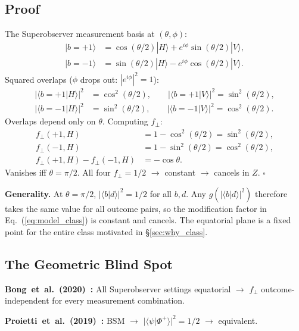\documentclass[twocolumn,aps,pra,superscriptaddress,floatfix,10pt]{revtex4-2}
\begin{document}
\subsection{Proof}

The Superobserver measurement basis at $(\theta,\phi)$:
\begin{align}
|b=+1\rangle &= \cos(\theta/2)|H\rangle
+ e^{i\phi}\sin(\theta/2)|V\rangle, \label{eq:basis_p} \\
|b=-1\rangle &= \sin(\theta/2)|H\rangle
- e^{i\phi}\cos(\theta/2)|V\rangle. \label{eq:basis_m}
\end{align}
Squared overlaps ($\phi$ drops out: $|e^{i\phi}|^2 = 1$):
\begin{align}
|\langle b=+1|H\rangle|^2 &= \cos^2(\theta/2), \qquad
|\langle b=+1|V\rangle|^2 = \sin^2(\theta/2), \label{eq:overlap_p} \\
|\langle b=-1|H\rangle|^2 &= \sin^2(\theta/2), \qquad
|\langle b=-1|V\rangle|^2 = \cos^2(\theta/2). \label{eq:overlap_m}
\end{align}
Overlaps depend only on $\theta$. Computing $f_\perp$:
\begin{align}
f_\perp(+1,H) &= 1 - \cos^2(\theta/2) = \sin^2(\theta/2), \label{eq:fp} \\
f_\perp(-1,H) &= 1 - \sin^2(\theta/2) = \cos^2(\theta/2), \label{eq:fm} \\
f_\perp(+1,H) - f_\perp(-1,H) &= -\cos\theta. \label{eq:diff}
\end{align}
Vanishes iff $\theta = \pi/2$. All four $f_\perp = 1/2$ $\to$ constant
$\to$ cancels in $Z$. \hfill $\square$

\textbf{Generality.} At $\theta = \pi/2$, $|\langle b|d\rangle|^2 = 1/2$
for all $b,d$. Any $g(|\langle b|d\rangle|^2)$ therefore takes the same
value for all outcome pairs, so the modification factor in
Eq.~(\ref{eq:model_class}) is constant and cancels. The equatorial
plane is a fixed point for the entire class motivated in
\S\ref{sec:why_class}.

\subsection{The Geometric Blind Spot}

\textbf{Bong~et~al.~(2020)~\cite{Bong2020}:} All Superobserver settings
equatorial $\to$ $f_\perp$ outcome-independent for every measurement
combination.

\textbf{Proietti~et~al.~(2019)~\cite{Proietti2019}:}
BSM $\to$ $|\langle\psi|\Phi^+\rangle|^2 = 1/2$ $\to$ equivalent.
\end{document}
